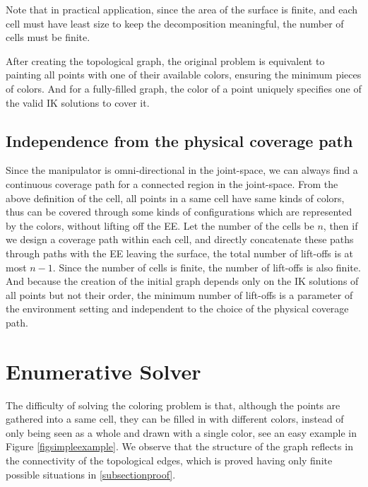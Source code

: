 \documentclass[journal]{IEEEtran}
\begin{document}
Note that in practical application, since the area of the surface is finite, and each cell must have least size to keep the decomposition meaningful, the number of cells must be finite. 


After creating the topological graph, the original problem is equivalent to painting all points with one of their available colors, ensuring the minimum pieces of colors. And for a fully-filled graph, the color of a point uniquely specifies one of the valid IK solutions to cover it. 

\subsection{Independence from the physical coverage path}

Since the manipulator is omni-directional in the joint-space, we can always find a continuous coverage path for a connected region in the joint-space. 
From the above definition of the cell, all points in a same cell have same kinds of colors, thus can be covered through some kinds of configurations which are represented by the colors, without lifting off the EE. 
Let the number of the cells be $n$, then if we design a coverage path within each cell, and directly concatenate these paths through paths with the EE leaving the surface, the total number of lift-offs is at most $n-1$. 
Since the number of cells is finite, the number of lift-offs is also finite. And because the creation of the initial graph depends only on the IK solutions of all points but not their order, the minimum number of lift-offs is a parameter of the environment setting and independent to the choice of the physical coverage path. 

\section{Enumerative Solver}\label{sectionenumerativesolver}
The difficulty of solving the coloring problem is that, although the points are gathered into a same cell, they can be filled in with different colors, 
instead of only being seen as a whole and drawn with a single color, see an easy example in Figure \ref{figsimpleexample}. 
We observe that the structure of the graph reflects in the connectivity of the topological edges, which is proved having only finite possible situations in \ref{subsectionproof}. 
\end{document}
